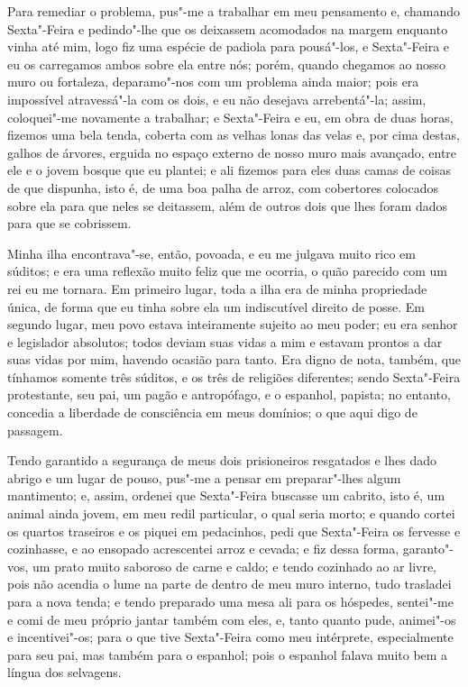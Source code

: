Para remediar o problema, pus"-me a trabalhar em meu pensamento e,
chamando Sexta"-Feira e pedindo"-lhe que os deixassem acomodados na margem
enquanto vinha até mim, logo fiz uma espécie de padiola para pousá"-los,
e Sexta"-Feira e eu os carregamos ambos sobre ela entre nós; porém,
quando chegamos ao nosso muro ou fortaleza, deparamo"-nos com um problema
ainda maior; pois era impossível atravessá"-la com os dois, e eu não
desejava arrebentá"-la; assim, coloquei"-me novamente a trabalhar; e
Sexta"-Feira e eu, em obra de duas horas, fizemos uma bela tenda, coberta
com as velhas lonas das velas e, por cima destas, galhos de árvores,
erguida no espaço externo de nosso muro mais avançado, entre ele e o
jovem bosque que eu plantei; e ali fizemos para eles duas camas de
coisas de que dispunha, isto é, de uma boa palha de arroz, com
cobertores colocados sobre ela para que neles se deitassem, além de
outros dois que lhes foram dados para que se cobrissem.

Minha ilha encontrava"-se, então, povoada, e eu me julgava muito rico em
súditos; e era uma reflexão muito feliz que me ocorria, o quão parecido
com um rei eu me tornara. Em primeiro lugar, toda a ilha era de minha
propriedade única, de forma que eu tinha sobre ela um indiscutível
direito de posse. Em segundo lugar, meu povo estava inteiramente sujeito
ao meu poder; eu era senhor e legislador absolutos; todos deviam suas
vidas a mim e estavam prontos a dar suas vidas por mim, havendo ocasião
para tanto. Era digno de nota, também, que tínhamos somente três
súditos, e os três de religiões diferentes; sendo Sexta"-Feira
protestante, seu pai, um pagão e antropófago, e o espanhol, papista; no
entanto, concedia a liberdade de consciência em meus domínios; o que
aqui digo de passagem.

Tendo garantido a segurança de meus dois prisioneiros resgatados e lhes
dado abrigo e um lugar de pouso, pus"-me a pensar em preparar"-lhes algum
mantimento; e, assim, ordenei que Sexta"-Feira buscasse um cabrito, isto
é, um animal ainda jovem, em meu redil particular, o qual seria morto; e
quando cortei os quartos traseiros e os piquei em pedacinhos, pedi que
Sexta"-Feira os fervesse e cozinhasse, e ao ensopado acrescentei arroz e
cevada; e fiz dessa forma, garanto"-vos, um prato muito saboroso de carne
e caldo; e tendo cozinhado ao ar livre, pois não acendia o lume na parte
de dentro de meu muro interno, tudo trasladei para a nova tenda; e tendo
preparado uma mesa ali para os hóspedes, sentei"-me e comi de meu próprio
jantar também com eles, e, tanto quanto pude, animei"-os e incentivei"-os;
para o que tive Sexta"-Feira como meu intérprete, especialmente para seu
pai, mas também para o espanhol; pois o espanhol falava muito bem a
língua dos selvagens.

